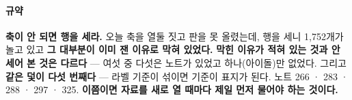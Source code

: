\documentclass[10pt]{article}
\begin{document}
\paragraph{규약} \textbf{축이 안 되면 행을 세라.} 오늘 축을 열둘 짓고 판을
못 올렸는데, 행을 세니 1,752개가 놀고 있고 \textbf{그 대부분이 이미 잰
이유로 막혀 있었다.} \textbf{막힌 이유가 적혀 있는 것과 안 세어 본 것은
다르다} --- 여섯 중 다섯은 노트가 있었고 하나(아이돌)만 없었다.
그리고 \textbf{같은 덫이 다섯 번째다} --- 라벨 기준이 섞이면 기준이 표지가
된다. 노트 266 · 283 · 288 · 297 · 325. \textbf{이쯤이면 자료를 새로 열
때마다 제일 먼저 물어야 하는 것이다.}
\end{document}

